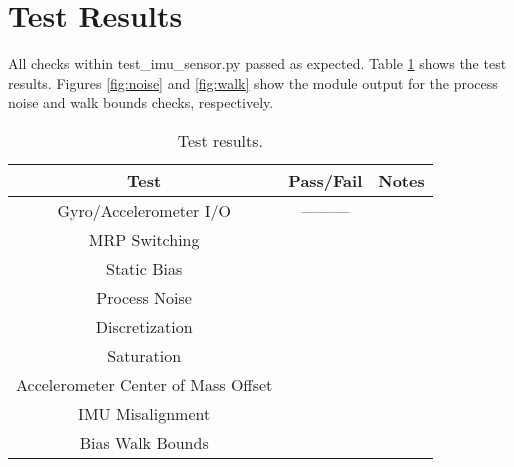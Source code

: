 \documentclass[]{BasiliskReportMemo}
\begin{document}
\section{Test Results}

All checks within test\_imu\_sensor.py passed as expected. Table \ref{tab:results} shows the test results. Figures \ref{fig:noise} and \ref{fig:walk} show the module output for the process noise and walk bounds checks, respectively.

\begin{table}[htbp]
	\caption{Test results.}
	\label{tab:results}
	\centering \fontsize{10}{10}\selectfont
	\begin{tabular}{c | c | c  } %
		\hline
		\textbf{Test} 						  			   & \textbf{Pass/Fail} 						   			& \textbf{Notes} \\ \hline
		Gyro/Accelerometer I/O 		   				& --------- 												& \\ \hline
		MRP Switching 					   				&  	   & \\ \hline
		Static Bias 										 &  				 & \\ \hline
		Process Noise 							         &  				& \\ \hline
		Discretization 						  			   &     & \\ \hline
		Saturation 							   				&   		 & \\ \hline
		Accelerometer Center of Mass Offset &     & \\ \hline
		IMU Misalignment 							   &      & \\ \hline
		Bias Walk Bounds 							   &    & \\ \hline
	\end{tabular}
\end{table}

 \label{fig:noise}
 \label{fig:walk}
\end{document}
